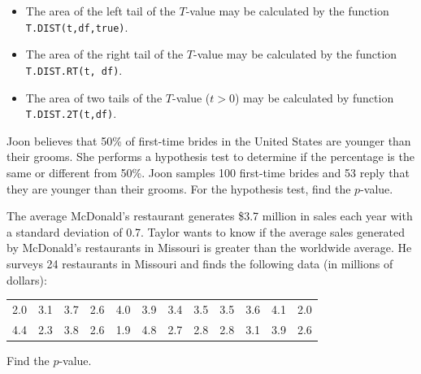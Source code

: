 \begin{itemize}

  \item
    The area of the left tail of the \(T\)-value may be calculated by
    the function \texttt{T.DIST(t,df,true)}.
  \item
    The area of the right tail of the \(T\)-value may be calculated by
    the function \texttt{T.DIST.RT(t,\ df)}.
  \item
    The area of two tails of the \(T\)-value
    (\(t > 0\)) may be calculated by
    function \texttt{T.DIST.2T(t,df)}.

\end{itemize}

\begin{exercise}

Joon believes that 50\% of first-time brides in the United States are
younger than their grooms. She performs a hypothesis test to determine
if the percentage is the same or different from 50\%. Joon samples 100
first-time brides and 53 reply that they are younger than their grooms.
For the hypothesis test, find the \(p\)-value.

\end{exercise}
\vspace*{6\baselineskip}

\begin{exercise}

The average McDonald's restaurant generates \$3.7 million in sales each
year with a standard deviation of 0.7. Taylor wants to know if the
average sales generated by McDonald's restaurants in Missouri is greater
than the worldwide average. He surveys 24 restaurants in Missouri and
finds the following data (in millions of dollars):

\begin{tabular}{*{12}{c}}
  2.0 & 3.1 & 3.7 & 2.6 & 4.0 & 3.9 & 3.4 & 3.5 & 3.5 & 3.6 & 4.1 & 2.0 \\ 
  4.4 & 2.3 & 3.8 & 2.6 & 1.9 & 4.8 & 2.7 & 2.8 & 2.8 & 3.1 & 3.9 & 2.6  
\end{tabular}

Find the \(p\)-value.

\end{exercise}
\vspace*{6\baselineskip}

